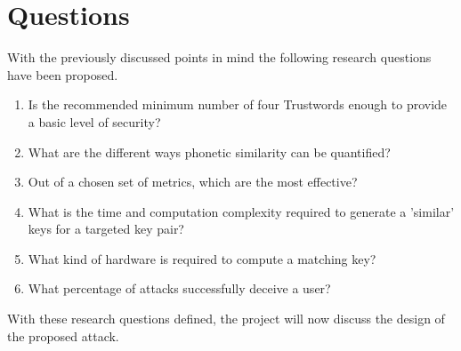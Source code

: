 \section{Questions}

With the previously discussed points in mind the following research questions have been proposed.

\begin{enumerate}

    \item Is the recommended minimum number of four Trustwords enough to provide a basic level of security? \label{goal:numberOfTrustwords}
    
    \item What are the different ways phonetic similarity can be quantified?  \label{goal:phoneticSimilarity}

    \item Out of a chosen set of metrics, which are the most effective? \label{goal:bestMetrics}

    \item What is the time and computation complexity required to generate a 'similar' keys for a targeted key pair? \label{goal:complexity}
    
    \item What kind of hardware is required to compute a matching key? \label{goal:hardwareRequired}

    \item What percentage of attacks successfully deceive a user? \label{goal:attackPercentage}
\end{enumerate}

With these research questions defined, the project will now discuss the design of the proposed attack.